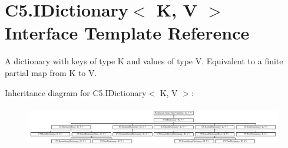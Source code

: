 \hypertarget{interface_c5_1_1_i_dictionary}{}\section{C5.\+I\+Dictionary$<$ K, V $>$ Interface Template Reference}
\label{interface_c5_1_1_i_dictionary}


A dictionary with keys of type K and values of type V. Equivalent to a finite partial map from K to V.  


Inheritance diagram for C5.\+I\+Dictionary$<$ K, V $>$\+:\begin{figure}[H]
\begin{center}
\leavevmode
\includegraphics[height=1.801802cm]{interface_c5_1_1_i_dictionary}
\end{center}
\end{figure}
